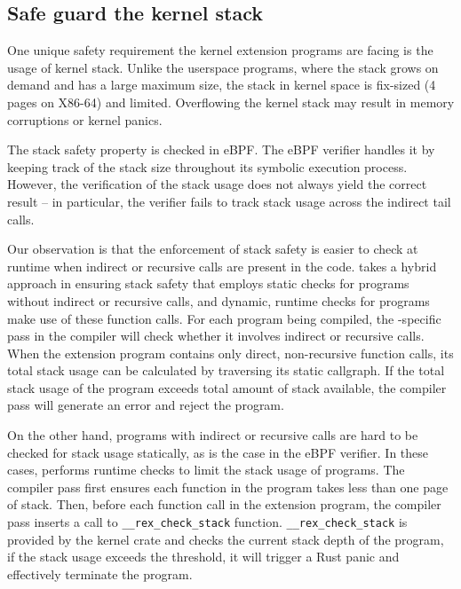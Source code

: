 \subsection{Safe guard the kernel stack}
One unique safety requirement the kernel extension programs are facing is the
    usage of kernel stack.
Unlike the userspace programs, where the stack grows on demand and has a large
    maximum size,
    the stack in kernel space is fix-sized (4 pages on X86-64) and limited.
Overflowing the kernel stack may result in memory corruptions or kernel panics.

The stack safety property is checked in eBPF.
The eBPF verifier handles it by keeping track of the stack size throughout its
    symbolic execution process.
However, the verification of the stack usage does not always yield the correct
    result -- in particular, the verifier fails to track stack usage across the
    indirect tail calls.

Our observation is that the enforcement of stack safety is easier to check at
    runtime when indirect or recursive calls are present in the code.
\projname{} takes a hybrid approach in ensuring stack safety that employs
    static checks for programs without indirect or recursive calls, and
    dynamic, runtime checks for programs make use of these function calls.
For each program being compiled, the \projname{}-specific pass in the compiler
    will check whether it involves indirect or recursive calls.
When the extension program contains only direct, non-recursive function calls,
    its total stack usage can be calculated by traversing its static callgraph.
If the total stack usage of the program exceeds total amount of stack
    available, the \projname{} compiler pass will generate an error and reject
    the program.

On the other hand, programs with indirect or recursive calls are hard to be
    checked for stack usage statically, as is the case in the eBPF verifier.
In these cases, \projname{} performs runtime checks to limit the stack usage of
    programs.
The \projname{} compiler pass first ensures each function in the program takes
    less than one page of stack.
Then, before each function call in the extension program, the \projname{}
    compiler pass inserts a call to \texttt{\_\_rex\_check\_stack} function.
\texttt{\_\_rex\_check\_stack} is provided by the kernel crate and checks the
    current stack depth of the program, if the stack usage exceeds the
    threshold, it will trigger a Rust panic and effectively terminate the
    program.

